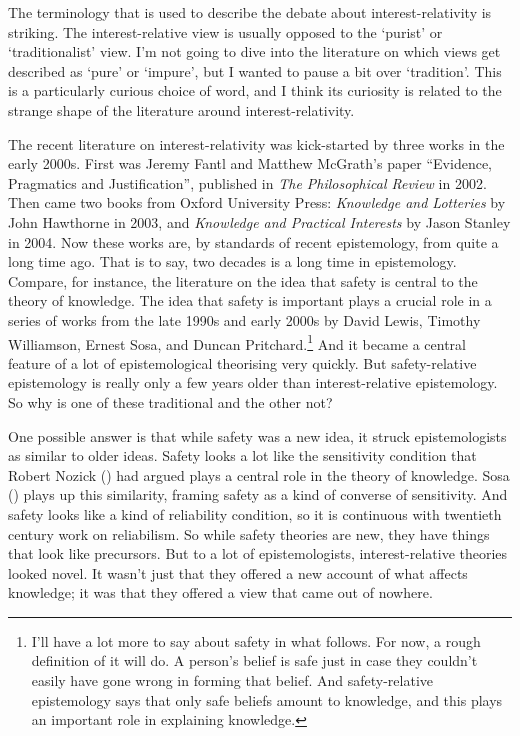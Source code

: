 \documentclass[
  10pt,
  letterpaper,
  twoside]{scrbook}
\begin{document}
The terminology that is used to describe the debate about
interest-relativity is striking. The interest-relative view is usually
opposed to the `purist' or `traditionalist' view. I'm not going to dive
into the literature on which views get described as `pure' or `impure',
but I wanted to pause a bit over `tradition'. This is a particularly
curious choice of word, and I think its curiosity is related to the
strange shape of the literature around interest-relativity.

The recent literature on interest-relativity was kick-started by three
works in the early 2000s. First was Jeremy Fantl and Matthew McGrath's
paper ``Evidence, Pragmatics and Justification'', published in \emph{The
Philosophical Review} in 2002. Then came two books from Oxford
University Press: \emph{Knowledge and Lotteries} by John Hawthorne in
2003, and \emph{Knowledge and Practical Interests} by Jason Stanley in
2004. Now these works are, by standards of recent epistemology, from
quite a long time ago. That is to say, two decades is a long time in
epistemology. Compare, for instance, the literature on the idea that
safety is central to the theory of knowledge. The idea that safety is
important plays a crucial role in a series of works from the late 1990s
and early 2000s by David Lewis, Timothy Williamson, Ernest Sosa, and
Duncan Pritchard.\footnote{I'll have a lot more to say about safety in
  what follows. For now, a rough definition of it will do. A person's
  belief is safe just in case they couldn't easily have gone wrong in
  forming that belief. And safety-relative epistemology says that only
  safe beliefs amount to knowledge, and this plays an important role in
  explaining knowledge.} And it became a central feature of a lot of
epistemological theorising very quickly. But safety-relative
epistemology is really only a few years older than interest-relative
epistemology. So why is one of these traditional and the other not?

One possible answer is that while safety was a new idea, it struck
epistemologists as similar to older ideas. Safety looks a lot like the
sensitivity condition that Robert Nozick
() had argued plays a central role in the
theory of knowledge. Sosa () plays up this
similarity, framing safety as a kind of converse of sensitivity. And
safety looks like a kind of reliability condition, so it is continuous
with twentieth century work on reliabilism. So while safety theories are
new, they have things that look like precursors. But to a lot of
epistemologists, interest-relative theories looked novel. It wasn't just
that they offered a new account of what affects knowledge; it was that
they offered a view that came out of nowhere.
\end{document}
